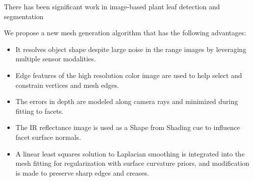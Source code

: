 There has been significant work in image-based plant leaf detection and segmentation~\cite{XXX}



We propose a new mesh generation algorithm that has the following advantages:
\begin{itemize}
\item It resolves object shape despite large noise in the range images by leveraging multiple sensor modalities.  
\item Edge features of the high resolution color image are used to help select and constrain vertices and mesh edges.  
\item The errors in depth are modeled along camera rays and minimized during fitting to facets.  \item The IR reflectance image is used as a Shape from Shading cue to influence facet surface normals.  
\item A linear least squares solution to Laplacian smoothing is integrated into the mesh fitting for regularization with surface curvature priors, and modification is made to preserve sharp edges and creases.
\end{itemize}



